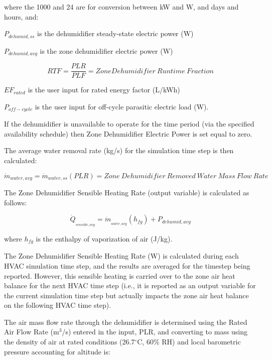 where the 1000 and 24 are for conversion between kW and W, and days and hours, and:

\({P_{dehumid,ss}}\) is the dehumidifier steady-state electric power (W)

\({P_{dehumid,avg}}\) is the zone dehumidifier electric power (W)

\begin{equation}
RTF = \frac{{PLR}}{{PLF}} = Zone Dehumidifier~Runtime~Fraction
\end{equation}

\(E{F_{rated}}\) is the user input for rated energy factor (L/kWh)

\({P_{off - cycle}}\) is the user input for off-cycle parasitic electric load (W).

If the dehumidifier is unavailable to operate for the time period (via the specified availability schedule) then Zone Dehumidifier Electric Power is set equal to zero.

The average water removal rate (kg/s) for the simulation time step is then calculated:

\begin{equation}
{\dot m_{water,avg}} = {\dot m_{water,ss}}\left( {PLR} \right) = {Zone~Dehumidifier~Removed~Water~Mass~Flow~Rate}
\end{equation}

The Zone Dehumidifier Sensible Heating Rate (output variable) is calculated as follows:

\begin{equation}
{\dot Q_{_{sensible,avg}}} = {\dot m_{_{water,avg}}}\left( {{h_{fg}}} \right) + {P_{dehumid,avg}}
\end{equation}

where \(h_{fg}\) is the enthalpy of vaporization of air (J/kg).

The Zone Dehumidifier Sensible Heating Rate (W) is calculated during each HVAC simulation time step, and the results are averaged for the timestep being reported. However, this sensible heating is carried over to the zone air heat balance for the next HVAC time step (i.e., it is reported as an output variable for the current simulation time step but actually impacts the zone air heat balance on the following HVAC time step).

The air mass flow rate through the dehumidifier is determined using the Rated Air Flow Rate (m\(^{3}\)/s) entered in the input, PLR, and converting to mass using the density of air at rated conditions (26.7\(^{\circ}\)C, 60\% RH) and local barometric pressure accounting for altitude is:

